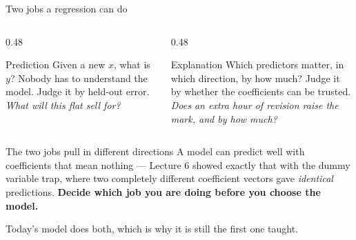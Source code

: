 \documentclass[aspectratio=169]{beamer}
\begin{document}
\begin{frame}[shrink=6]{Two jobs a regression can do}
  \begin{columns}[T]
    \begin{column}{0.48\textwidth}
      \begin{block}{Prediction}
        Given a new $x$, what is $y$? Nobody has to understand the model.
        Judge it by held-out error.\\[0.3em]
        \small \emph{What will this flat sell for?}
      \end{block}
    \end{column}
    \begin{column}{0.48\textwidth}
      \begin{exampleblock}{Explanation}
        Which predictors matter, in which direction, by how much? Judge it by
        whether the coefficients can be trusted.\\[0.3em]
        \small \emph{Does an extra hour of revision raise the mark, and by
        how much?}
      \end{exampleblock}
    \end{column}
  \end{columns}
  \vspace{0.3em}
  \begin{alertblock}{The two jobs pull in different directions}
    A model can predict well with coefficients that mean nothing --- Lecture 6
    showed exactly that with the dummy variable trap, where two completely
    different coefficient vectors gave \emph{identical} predictions.
    \textbf{Decide which job you are doing before you choose the model.}
  \end{alertblock}
  \begin{center}\small
    Today's model does both, which is why it is still the first one taught.
  \end{center}
\end{frame}
\end{document}
